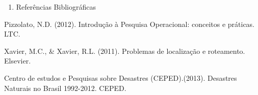 \documentclass[
]{article}
\providecommand{\tightlist}{%
  \setlength{\itemsep}{0pt}\setlength{\parskip}{0pt}}
\begin{document}
\newpage

\begin{enumerate}
\def\labelenumi{\arabic{enumi}.}
\setcounter{enumi}{6}
\tightlist
\item
  Referências Bibliográficas
\end{enumerate}

Pizzolato, N.D. (2012). Introdução à Pesquisa Operacional: conceitos e
práticas. LTC.

Xavier, M.C., \& Xavier, R.L. (2011). Problemas de localização e
roteamento. Elsevier.

Centro de estudos e Pesquisas sobre Desastres (CEPED).(2013). Desastres
Naturais no Brasil 1992-2012. CEPED.
\end{document}
